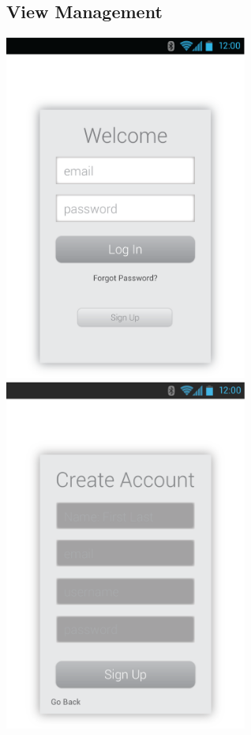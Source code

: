\documentclass[12pt, letterpaper]{article}
\begin{document}
\begin{center}
\section{View Management}
\includegraphics[width=0.6\textwidth]{OpenComm_Login.eps}
\clearpage
\includegraphics[width=0.6\textwidth]{Create_Account.eps}
\clearpage

\end{center}
\end{document}
